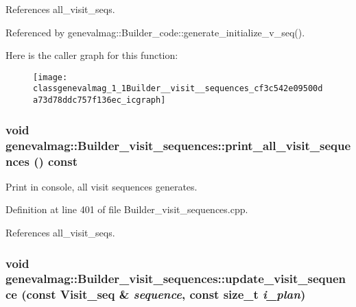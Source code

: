 References all\_\-visit\_\-seqs.

Referenced by genevalmag::Builder\_\-code::generate\_\-initialize\_\-v\_\-seq().

Here is the caller graph for this function:\nopagebreak
\begin{figure}[H]
\begin{center}
\leavevmode
\texttt{[image: classgenevalmag\_1\_1Builder\_\_visit\_\_sequences\_cf3c542e09500da73d78ddc757f136ec\_icgraph]}
\end{center}
\end{figure}
\hypertarget{classgenevalmag_1_1Builder__visit__sequences_d3073f1a763bdbd4812f64a16bb6a67d}{
\subsubsection[{print\_\-all\_\-visit\_\-sequences}]{\setlength{\rightskip}{0pt plus 5cm}void genevalmag::Builder\_\-visit\_\-sequences::print\_\-all\_\-visit\_\-sequences () const}}
\label{classgenevalmag_1_1Builder__visit__sequences_d3073f1a763bdbd4812f64a16bb6a67d}


Print in console, all visit sequences generates. 

Definition at line 401 of file Builder\_\-visit\_\-sequences.cpp.

References all\_\-visit\_\-seqs.\hypertarget{classgenevalmag_1_1Builder__visit__sequences_eb3f3076ab75a8869785d98c0c3bcdf2}{
\subsubsection[{update\_\-visit\_\-sequence}]{\setlength{\rightskip}{0pt plus 5cm}void genevalmag::Builder\_\-visit\_\-sequences::update\_\-visit\_\-sequence (const {\bf Visit\_\-seq} \& {\em sequence}, \/  const size\_\-t {\em i\_\-plan})}}
\label{classgenevalmag_1_1Builder__visit__sequences_eb3f3076ab75a8869785d98c0c3bcdf2}



